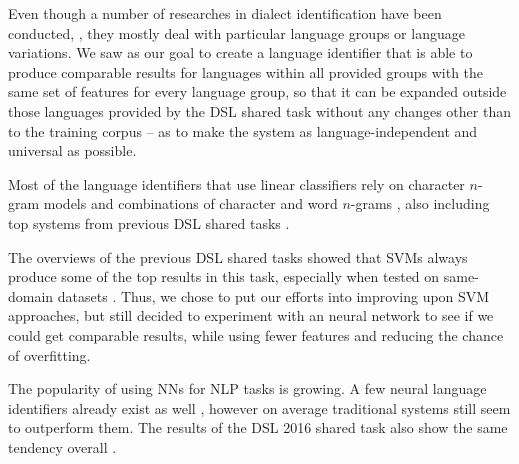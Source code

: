 Even though a number of researches in dialect identification have been conducted, \parencite[among many others]{tiedemann-ljubesic:2012:COLING,lui2013classifying,maier2014language,ljubesic2015discriminating}, they mostly deal with particular language groups or language variations. We saw as our goal to create a language identifier that is able to produce comparable results for languages within all provided groups with the same set of features for every language group, so that it can be expanded outside those languages provided by the DSL shared task without any changes other than to the training corpus -- as to make the system as language-independent and universal as possible.

Most of the language identifiers that use linear classifiers rely on character $n$-gram models \parencite{carter2011semi,ng2011improving,zampieri2012automatic} and combinations of character and word $n$-grams \parencite{milne2012study,vogel2012robust,goldszmidt2013boot}, also including top systems from previous DSL shared tasks \parencite{goutte-leger:2015:LT4VarDial,malmasi-dras:2015:LT4VarDial,ccoltekin-rama:2016:VarDial3}.

The overviews of the previous DSL shared tasks \parencite{zampieri:2014:VarDial,zampieri:2015:LT4VarDial,dslrec:2016} showed that SVMs always produce some of the top results in this task, especially when tested on same-domain datasets \parencite{ccoltekin-rama:2016:VarDial3}. Thus, we chose to put our efforts into improving upon SVM approaches, but still decided to experiment with an neural network to see if we could get comparable results, while using fewer features and reducing the chance of overfitting.

The popularity of using NNs for NLP tasks is growing. A few neural language identifiers already exist as well \parencite[among others]{tian2003scalable,takcci2012minimal,simoes2014language}, however on average traditional systems still seem to outperform them. The results of the DSL 2016 shared task also show the same tendency overall \parencite{bjerva:2016:VarDial3,cianflone-kosseim:2016:VarDial3,ccoltekin-rama:2016:VarDial3,dsl2016}.%



